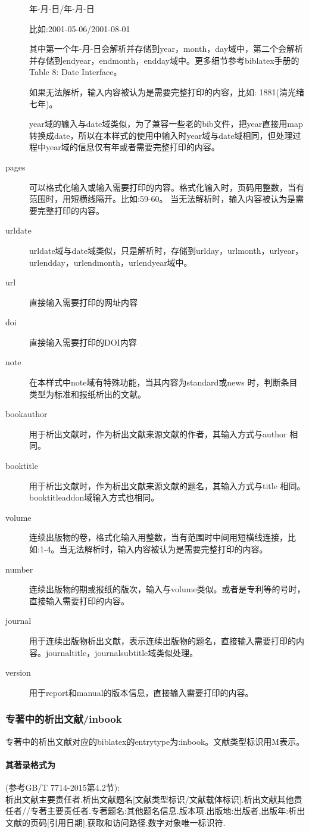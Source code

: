 \begin{description}
      年-月-日/年-月-日

      比如:2001-05-06/2001-08-01

      其中第一个年-月-日会解析并存储到year，month，day域中，第二个会解析并存储到endyear，endmonth，endday域中。更多细节参考biblatex手册的Table 8: Date Interface。

      如果无法解析，输入内容被认为是需要完整打印的内容，比如:
      1881(清光绪七年)。

      year域的输入与date域类似，为了兼容一些老的bib文件，把year直接用map转换成date，所以在本样式的使用中输入时year域与date域相同，但处理过程中year域的信息仅有年或者需要完整打印的内容。

  \item[pages] 可以格式化输入或输入需要打印的内容。格式化输入时，页码用整数，当有范围时，用短横线隔开。比如:59-60。 当无法解析时，输入内容被认为是需要完整打印的内容。
  \item[urldate] urldate域与date域类似，只是解析时，存储到urlday，urlmonth，urlyear，urlendday，urlendmonth，urlendyear域中。
  \item[url] 直接输入需要打印的网址内容
  \item[doi] 直接输入需要打印的DOI内容
  \item[note] 在本样式中note域有特殊功能，当其内容为standard或news 时，判断条目类型为标准和报纸析出的文献。
  \item[bookauthor] 用于析出文献时，作为析出文献来源文献的作者，其输入方式与author 相同。
  \item[booktitle] 用于析出文献时，作为析出文献来源文献的题名，其输入方式与title 相同。booktitleaddon域输入方式也相同。
  \item[volume] 连续出版物的卷，格式化输入用整数，当有范围时中间用短横线连接，比如:1-4。当无法解析时，输入内容被认为是需要完整打印的内容。
  \item[number] 连续出版物的期或报纸的版次，输入与volume类似。或者是专利等的号时，直接输入需要打印的内容。
  \item[journal] 用于连续出版物析出文献，表示连续出版物的题名，直接输入需要打印的内容。journaltitle，journalsubtitle域类似处理。
   \item[version] 用于report和manual的版本信息，直接输入需要打印的内容。
\end{description}

\subsubsection{专著中的析出文献/inbook}
\begin{refentry}{}{}
专著中的析出文献对应的biblatex的entrytype为:inbook。文献类型标识用M表示。

\paragraph{其著录格式为}(参考GB/T 7714-2015第4.2节):\\
析出文献主要责任者.析出文献题名[文献类型标识/文献载体标识].析出文献其他责任者//专著主要责任者.专著题名:其他题名信息.版本项.出版地:出版者,出版年:析出文献的页码[引用日期].获取和访问路径.数字对象唯一标识符.
\end{refentry}

